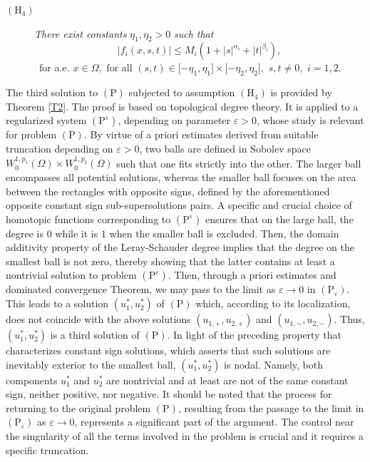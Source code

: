 \documentclass[11pt]{amsart}
\theoremstyle{definition}
\theoremstyle{remark}
\numberwithin{equation}{section}
\begin{document}
\begin{description}
\item[$(\mathrm{H}_{4})$] \textit{There exist constants }$\eta _{1},\eta
_{2}>0$ \textit{such that} 
\begin{equation*}
|f_{i}(x,s,t)|\leq M_{i}(1+|s|^{\alpha _{i}}+|t|^{\beta _{i}}),
\end{equation*}%
\ for a.e\textit{. }$x\in \Omega ,$ for all $(s,t)\in \lbrack -\eta
_{1},\eta _{1}]\times \lbrack -\eta _{2},\eta _{2}],$ $s,t\neq 0,$ $i=1,2.$
\end{description}

The third solution to $(\mathrm{P})$ subjected to assumption $(\mathrm{H}%
_{4})$ is provided by Theorem \ref{T2}. The proof is based on topological
degree theory. It is applied to a regularized system $(\mathrm{P}%
^{\varepsilon })$, depending on parameter $\varepsilon >0$, whose study is
relevant for problem $(\mathrm{P})$. By virtue of a priori estimates derived
from suitable truncation depending on $\varepsilon >0$, two balls are
defined in Sobolev space $W_{0}^{1,p_{1}}(\Omega )\times
W_{0}^{1,p_{2}}(\Omega )$ such that one fits strictly into the other. The
larger ball encompasses all potential solutions, whereas the smaller ball
focuses on the area between the rectangles with opposite signs, defined by
the aforementioned opposite constant sign sub-supersolutions pairs. A
specific and crucial choice of homotopic functions corresponding to $(%
\mathrm{P}^{\varepsilon })$ ensures that on the large ball, the degree is $0$
while it is $1$ when the smaller ball is excluded. Then, the domain
additivity property of the Leray-Schauder degree implies that the degree on
the smallest ball is not zero, thereby showing that the latter contains at
least a nontrivial solution to problem $(\mathrm{P}^{\varepsilon })$. Then,
through a priori estimates and dominated convergence Theorem, we may pass to
the limit as $\varepsilon \rightarrow 0$ in $(\mathrm{P}_{\varepsilon })$.
This leads to a solution $(u_{1}^{\ast },u_{2}^{\ast })$ of $(\mathrm{P})$
which, according to its localization, does not coincide with the above
solutions $(u_{1,+},u_{2,+})$ and $(u_{1,-},u_{2,-})$. Thus, $(u_{1}^{\ast
},u_{2}^{\ast })$ is a third solution of $(\mathrm{P})$. In light of the
preceding property that characterizes constant sign solutions, which asserts
that such solutions are inevitably exterior to the smallest ball, $%
(u_{1}^{\ast },u_{2}^{\ast })$ is nodal. Namely, both components $%
u_{1}^{\ast }$ and $u_{2}^{\ast }$ are nontrivial and at least are not of
the same constant sign, neither positive, nor negative. It should be noted
that the process for returning to the original problem $(\mathrm{P})$,
resulting from the passage to the limit in $(\mathrm{P}_{\varepsilon })$ as $%
\varepsilon \rightarrow 0$, represents a significant part of the argument.
The control near the singularity of all the terms involved in the problem is
crucial and it requires a specific truncation.
\end{document}

